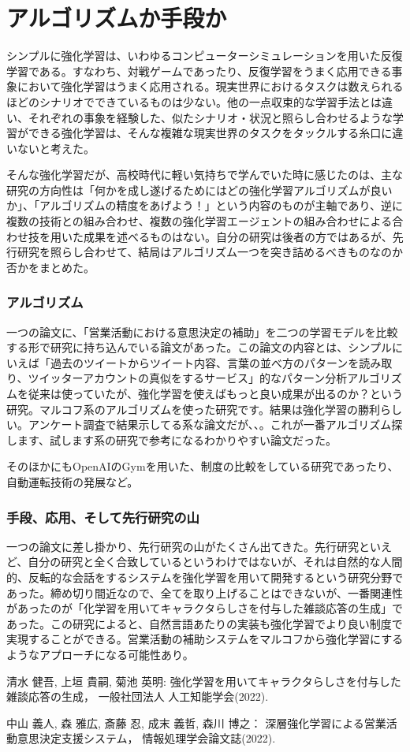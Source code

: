 \documentclass[submit,uplatex]{ipsj}
\begin{document}
\section{アルゴリズムか手段か}

シンプルに強化学習は、いわゆるコンピューターシミュレーションを用いた反復学習である。すなわち、対戦ゲームであったり、反復学習をうまく応用できる事象において強化学習はうまく応用される。現実世界におけるタスクは数えられるほどのシナリオでできているものは少ない。他の一点収束的な学習手法とは違い、それぞれの事象を経験した、似たシナリオ・状況と照らし合わせるような学習ができる強化学習は、そんな複雑な現実世界のタスクをタックルする糸口に違いないと考えた。

そんな強化学習だが、高校時代に軽い気持ちで学んでいた時に感じたのは、主な研究の方向性は「何かを成し遂げるためにはどの強化学習アルゴリズムが良いか」、「アルゴリズムの精度をあげよう！」という内容のものが主軸であり、逆に複数の技術との組み合わせ、複数の強化学習エージェントの組み合わせによる合わせ技を用いた成果を述べるものはない。自分の研究は後者の方ではあるが、先行研究を照らし合わせて、結局はアルゴリズム一つを突き詰めるべきものなのか否かをまとめた。

\subsubsection{アルゴリズム}

一つの論文に、「営業活動における意思決定の補助」を二つの学習モデルを比較する形で研究に持ち込んでいる論文があった。この論文の内容とは、シンプルにいえば「過去のツイートからツイート内容、言葉の並べ方のパターンを読み取り、ツイッターアカウントの真似をするサービス」的なパターン分析アルゴリズムを従来は使っていたが、強化学習を使えばもっと良い成果が出るのか？という研究。マルコフ系のアルゴリズムを使った研究です。結果は強化学習の勝利らしい。アンケート調査で結果示してる系な論文だが、、。これが一番アルゴリズム探します、試します系の研究で参考になるわかりやすい論文だった。

そのほかにもOpenAIのGymを用いた、制度の比較をしている研究であったり、自動運転技術の発展など。

\subsubsection{手段、応用、そして先行研究の山}

一つの論文に差し掛かり、先行研究の山がたくさん出てきた。先行研究といえど、自分の研究と全く合致しているというわけではないが、それは自然的な人間的、反転的な会話をするシステムを強化学習を用いて開発するという研究分野であった。締め切り間近なので、全てを取り上げることはできないが、一番関連性があったのが「化学習を用いてキャラクタらしさを付与した雑談応答の生成」であった。この研究によると、自然言語あたりの実装も強化学習でより良い制度で実現することができる。営業活動の補助システムをマルコフから強化学習にするようなアプローチになる可能性あり。

\begin{thebibliography}{2}
清水 健吾, 上垣 貴嗣, 菊池 英明:
強化学習を用いてキャラクタらしさを付与した雑談応答の生成，
一般社団法人 人工知能学会(2022).

中山 義人, 森 雅広, 斎藤 忍, 成末 義哲, 森川 博之：
深層強化学習による営業活動意思決定支援システム，
情報処理学会論文誌(2022).

\end{thebibliography}
\end{document}
